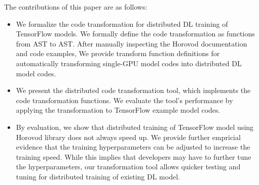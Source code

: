 The contributions of this paper are as follows:

\begin{itemize}
  \item We formalize the code transformation for distributed DL training
        of TensorFlow models. We formally define the code transformation
        as functions from AST to AST. After manually inspecting
        the Horovod documentation and code examples,
        We provide transform function definitions for 
        automatically transforming single-GPU model codes into
        distributed DL model codes.

  \item We present the distributed code transformation tool, which implements
        the code transformation functions. We evaluate the tool's performance
        by applying the transformation to TensorFlow example model codes.

  \item By evaluation, we show that distributed training of TensorFlow
    model using Horovod library does not always
    speed up. We provide further empricial evidence that the training
    hyperparameters can be adjusted to increase the training speed.
    While this implies that developers may have to further tune the
    hyperparameters, our transformation tool allows quicker testing and
    tuning for distributed training of existing DL model. 

\end{itemize}
